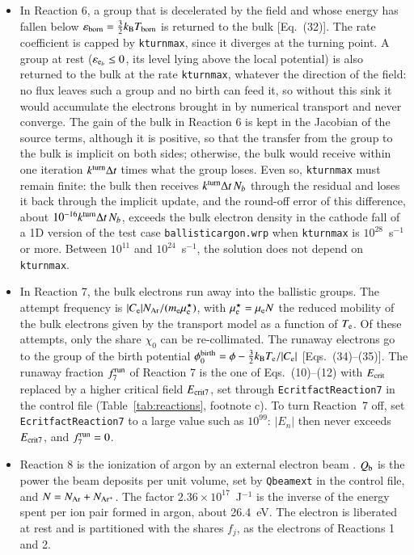 \documentclass{warpdoc}
\newcommand{\eb}{{\rm e}_b}
\begin{document}
\begin{itemize}
\item In Reaction 6, a group that is decelerated by the field and whose energy has fallen below $\varepsilon_{\rm born}=\tfrac{3}{2}k_{\rm B}T_{\rm born}$ is returned to the bulk [Eq.~(32)]. The rate coefficient is capped by {\tt kturnmax}, since it diverges at the turning point. A group at rest ($\varepsilon_{\eb}\le 0$, its level lying above the local potential) is also returned to the bulk at the rate {\tt kturnmax}, whatever the direction of the field: no flux leaves such a group and no birth can feed it, so without this sink it would accumulate the electrons brought in by numerical transport and never converge. The gain of the bulk in Reaction 6 is kept in the Jacobian of the source terms, although it is positive, so that the transfer from the group to the bulk is implicit on both sides; otherwise, the bulk would receive within one iteration $k^{\rm turn}\Delta t$ times what the group loses. Even so, {\tt kturnmax} must remain finite: the bulk then receives $k^{\rm turn}\Delta t\,N_b$ through the residual and loses it back through the implicit update, and the round-off error of this difference, about $10^{-16}k^{\rm turn}\Delta t\,N_b$, exceeds the bulk electron density in the cathode fall of a 1D version of the test case {\tt ballisticargon.wrp} when {\tt kturnmax} is $10^{28}$~s$^{-1}$ or more. Between $10^{11}$ and $10^{24}$~s$^{-1}$, the solution does not depend on {\tt kturnmax}.

\item In Reaction 7, the bulk electrons run away into the ballistic groups. The attempt frequency is $|C_{\rm e}|N_{\rm Ar}/(m_{\rm e}\mu_{\rm e}^\star)$, with $\mu^\star_{\rm e}=\mu_{\rm e}N$ the reduced mobility of the bulk electrons given by the transport model as a function of $T_{\rm e}$. Of these attempts, only the share $\chi_0$ can be re-collimated. The runaway electrons go to the group of the birth potential $\phi^{\rm birth}_0=\phi-\tfrac{3}{2}k_{\rm B}T_{\rm e}/|C_{\rm e}|$ [Eqs.~(34)--(35)]. The runaway fraction $f^{\rm run}_7$ of Reaction 7 is the one of Eqs.~(10)--(12) with $E_{\rm crit}$ replaced by a higher critical field $E_{\rm crit7}$, set through {\tt EcritfactReaction7} in the control file (Table~\ref{tab:reactions}, footnote c). To turn Reaction~7 off, set {\tt EcritfactReaction7} to a large value such as $10^{99}$: $|E_n|$ then never exceeds $E_{\rm crit7}$, and $f^{\rm run}_7=0$.

\item Reaction 8 is the ionization of argon by an external electron beam \cite{jcp:2013:parent}. $Q_{\rm b}$ is the power the beam deposits per unit volume, set by {\tt Qbeamext} in the control file, and $N=N_{\rm Ar}+N_{\rm Ar^+}$. The factor $2.36\times10^{17}$~J$^{-1}$ is the inverse of the energy spent per ion pair formed in argon, about 26.4~eV. The electron is liberated at rest and is partitioned with the shares $f_j$, as the electrons of Reactions 1 and 2.
\end{itemize}
\end{document}
